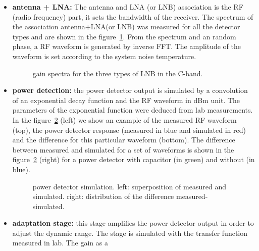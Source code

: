 \begin{itemize}
\item \textbf{antenna + LNA:} The antenna and LNA (or LNB) association
  is  the RF  (radio frequency)  part, it  sets the  bandwidth  of the
  receiver.  The  spectrum of the association  antenna+LNA(or LNB) was
  measured  for  all   the  detector  types  and  are   shown  in  the
  figure~\ref{fig:spectra}. From  the spectrum and an  random phase, a
  RF  waveform is  generated by  inverse  FFT.  The  amplitude of  the
  waveform is set according to the system noise temperature.
  \begin{figure}[H]                                                             
    \centering                                                                    
    \hspace*{-3ex}                                                                
    \caption{gain spectra for the three types of LNB in the C-band.}
  \label{fig:spectra}
  \end{figure}
\item \textbf{power detection:} the power detector output is simulated
  by  a  convolution of  an  exponential  decay  function and  the  RF
  waveform in  dBm unit.  The  parameters of the  exponential function
  were  deduced from lab  measurements.  In  the figure~\ref{fig:m3ex}
  (left) we  show an  example of the  measured RF waveform  (top), the
  power detector response (measured in  blue and simulated in red) and
  the difference for this particular waveform (bottom). The difference
  between measured  and simulated for a  set of waveforms  is shown in
  the  figure~\ref{fig:m3ex}   (right)  for  a   power  detector  with
  capacitor (in green) and without (in blue).
\begin{figure}[H]
  \centering
  \hspace*{-3ex}
  \caption{power detector  simulation. left: superposition  of measured
    and simulated. right: distribution of the difference measured-simulated.}
  \label{fig:m3ex}
\end{figure}
\item  \textbf{adaptation  stage:}  this  stage  amplifies  the  power
  detector output in order to  adjust the dynamic range.  The stage is
  simulated with the transfer function  measured in lab. The gain as a

\end{itemize}

